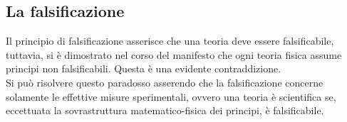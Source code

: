 \documentclass[]{article}
\begin{document}
	\subsection{La falsificazione}
	Il principio di falsificazione asserisce che una teoria deve essere falsificabile, tuttavia, si è dimostrato nel corso del manifesto che ogni teoria fisica assume principi non falsificabili. Questa è una evidente contraddizione.\\
	Si può risolvere questo paradosso asserendo che la falsificazione concerne solamente le effettive misure sperimentali, ovvero una teoria è scientifica se, eccettuata la sovrastruttura matematico-fisica dei principi, è falsificabile.
\end{document}
